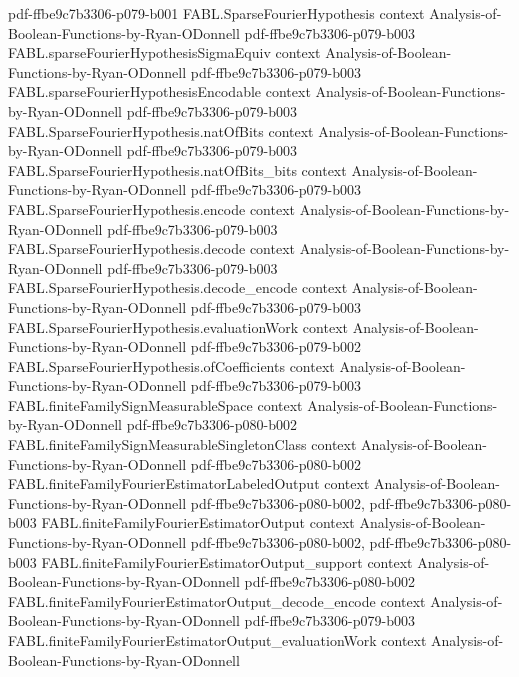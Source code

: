 \begin{theorem}
  {pdf-ffbe9c7b3306-p079-b001}
\proofstep
  {FABL.SparseFourierHypothesis}
  {context}
  {Analysis-of-Boolean-Functions-by-Ryan-ODonnell}
  {pdf-ffbe9c7b3306-p079-b003}
\proofstep
  {FABL.sparseFourierHypothesisSigmaEquiv}
  {context}
  {Analysis-of-Boolean-Functions-by-Ryan-ODonnell}
  {pdf-ffbe9c7b3306-p079-b003}
\proofstep
  {FABL.sparseFourierHypothesisEncodable}
  {context}
  {Analysis-of-Boolean-Functions-by-Ryan-ODonnell}
  {pdf-ffbe9c7b3306-p079-b003}
\proofstep
  {FABL.SparseFourierHypothesis.natOfBits}
  {context}
  {Analysis-of-Boolean-Functions-by-Ryan-ODonnell}
  {pdf-ffbe9c7b3306-p079-b003}
\proofstep
  {FABL.SparseFourierHypothesis.natOfBits_bits}
  {context}
  {Analysis-of-Boolean-Functions-by-Ryan-ODonnell}
  {pdf-ffbe9c7b3306-p079-b003}
\proofstep
  {FABL.SparseFourierHypothesis.encode}
  {context}
  {Analysis-of-Boolean-Functions-by-Ryan-ODonnell}
  {pdf-ffbe9c7b3306-p079-b003}
\proofstep
  {FABL.SparseFourierHypothesis.decode}
  {context}
  {Analysis-of-Boolean-Functions-by-Ryan-ODonnell}
  {pdf-ffbe9c7b3306-p079-b003}
\proofstep
  {FABL.SparseFourierHypothesis.decode_encode}
  {context}
  {Analysis-of-Boolean-Functions-by-Ryan-ODonnell}
  {pdf-ffbe9c7b3306-p079-b003}
\proofstep
  {FABL.SparseFourierHypothesis.evaluationWork}
  {context}
  {Analysis-of-Boolean-Functions-by-Ryan-ODonnell}
  {pdf-ffbe9c7b3306-p079-b002}
\proofstep
  {FABL.SparseFourierHypothesis.ofCoefficients}
  {context}
  {Analysis-of-Boolean-Functions-by-Ryan-ODonnell}
  {pdf-ffbe9c7b3306-p079-b003}
\proofstep
  {FABL.finiteFamilySignMeasurableSpace}
  {context}
  {Analysis-of-Boolean-Functions-by-Ryan-ODonnell}
  {pdf-ffbe9c7b3306-p080-b002}
\proofstep
  {FABL.finiteFamilySignMeasurableSingletonClass}
  {context}
  {Analysis-of-Boolean-Functions-by-Ryan-ODonnell}
  {pdf-ffbe9c7b3306-p080-b002}
\proofstep
  {FABL.finiteFamilyFourierEstimatorLabeledOutput}
  {context}
  {Analysis-of-Boolean-Functions-by-Ryan-ODonnell}
  {pdf-ffbe9c7b3306-p080-b002,
    pdf-ffbe9c7b3306-p080-b003}
\proofstep
  {FABL.finiteFamilyFourierEstimatorOutput}
  {context}
  {Analysis-of-Boolean-Functions-by-Ryan-ODonnell}
  {pdf-ffbe9c7b3306-p080-b002,
    pdf-ffbe9c7b3306-p080-b003}
\proofstep
  {FABL.finiteFamilyFourierEstimatorOutput_support}
  {context}
  {Analysis-of-Boolean-Functions-by-Ryan-ODonnell}
  {pdf-ffbe9c7b3306-p080-b002}
\proofstep
  {FABL.finiteFamilyFourierEstimatorOutput_decode_encode}
  {context}
  {Analysis-of-Boolean-Functions-by-Ryan-ODonnell}
  {pdf-ffbe9c7b3306-p079-b003}
\proofstep
  {FABL.finiteFamilyFourierEstimatorOutput_evaluationWork}
  {context}
  {Analysis-of-Boolean-Functions-by-Ryan-ODonnell}

\end{theorem}
